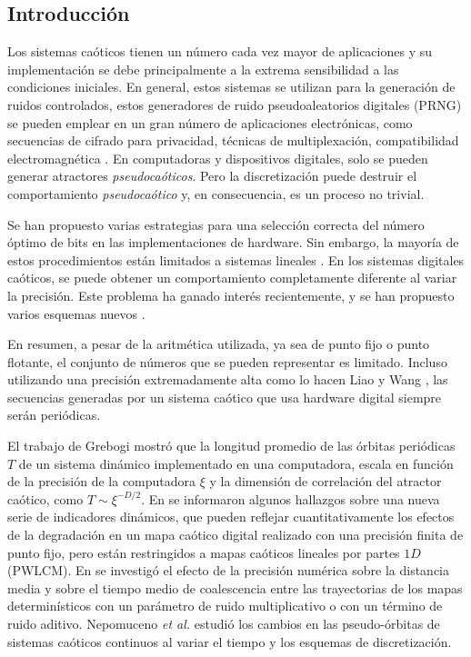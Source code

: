 \subsection{Introducción} \label{sec:intro}

Los sistemas caóticos tienen un número cada vez mayor de aplicaciones y su implementación se debe principalmente a la extrema sensibilidad a las condiciones iniciales.
En general, estos sistemas se utilizan para la generación de ruidos controlados, estos generadores de ruido pseudoaleatorios digitales (PRNG) se pueden emplear en un gran número de aplicaciones electrónicas, como secuencias de cifrado para privacidad, técnicas de multiplexación, compatibilidad electromagnética \cite{Machado2004, Smaoui2009, DeMicco2007A, DeMicco2007C, DeMicco2007B}.
En computadoras y dispositivos digitales, solo se pueden generar atractores \textsl{pseudocaóticos}.
Pero la discretización puede destruir el comportamiento \textsl{pseudocaótico} y, en consecuencia, es un proceso no trivial.

Se han propuesto varias estrategias para una selección correcta del número óptimo de bits en las implementaciones de hardware.
Sin embargo, la mayoría de estos procedimientos están limitados a sistemas lineales \cite{Constantinides2002, Constantinides2003}.
En los sistemas digitales caóticos, se puede obtener un comportamiento completamente diferente al variar la precisión.
Este problema ha ganado interés recientemente, y se han propuesto varios esquemas nuevos \cite{Ding2007, Asseri2002, Azzaz2009}.

En resumen, a pesar de la aritmética utilizada, ya sea de punto fijo o punto flotante, el conjunto de números que se pueden representar es limitado.
Incluso utilizando una precisión extremadamente alta como lo hacen Liao y Wang \cite{Liao2013a}, las secuencias generadas por un sistema caótico que usa hardware digital siempre serán periódicas.

El trabajo de Grebogi \cite{Grebogi1988} mostró que la longitud promedio de las órbitas periódicas $T$ de un sistema dinámico implementado en una computadora, escala en función de la precisión de la computadora $\xi$ y la dimensión de correlación del atractor caótico, como $T \sim \xi ^ {- D / 2}$.
En \cite{shujun2005} se informaron algunos hallazgos sobre una nueva serie de indicadores dinámicos, que pueden reflejar cuantitativamente los efectos de la degradación en un mapa caótico digital realizado con una precisión finita de punto fijo, pero están restringidos a mapas caóticos lineales por partes $1D$ (PWLCM).
En \cite{Dias2011} se investigó el efecto de la precisión numérica sobre la distancia media y sobre el tiempo medio de coalescencia entre las trayectorias de los mapas determinísticos con un parámetro de ruido multiplicativo o con un término de ruido aditivo.
Nepomuceno \textit{et al.} \cite{Nepomuceno2017} estudió los cambios en las pseudo-órbitas de sistemas caóticos continuos al variar el tiempo y los esquemas de discretización.

